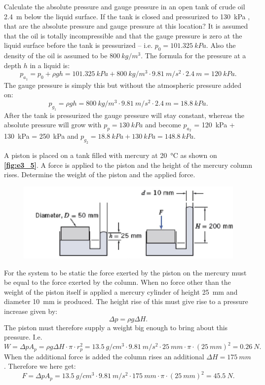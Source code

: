 
Calculate the absolute pressure and gauge pressure in an open tank of crude oil \qty{2,4}{m} below the liquid surface. If the tank is closed and pressurized to \qty{130}{kPa} , that are the absolute pressure and gauge pressure at this location?
\bigbreak
It is assumed that the oil is totally incompressible and that the gauge pressure is zero at the liquid surface before the tank is pressurized -- i.e. $p_0 = \qty{101,325}{kPa}$. Also the density of the oil is assumed to be $\qty{800}{kg/m^3}$. The formula for the pressure at a depth $h$ in a liquid is:
\[ 
p_{a_1} = p_0 + \rho g h = \qty{101,325}{kPa} + \qty{800}{kg/m^3} \cdot \qty{9,81}{m/s^2} \cdot \qty{2.4}{m} = \qty{120}{kPa}
.\]
The gauge pressure is simply this but without the atmospheric pressure added on:
\[ 
p_{g_1} = \rho g h = \qty{800}{kg/m^3} \cdot \qty{9,81}{m/s^2} \cdot \qty{2.4}{m} = \qty{18,8}{kPa}
.\]
After the tank is pressurized the gauge pressure will stay constant, whereas the absolute pressure will grow with $p_p = \qty{130}{kPa}$ and become $p_{a_2}$ = \qty{120}{kPa} + \qty{130}{kPa} = \qty{250}{kPa} and $p_{g_2} = \qty{18,8}{kPa} + \qty{130}{kPa} = \qty{148,8}{kPa}$.


A piston is placed on a tank filled with mercury at \qty{20}{\celsius} as shown on \textbf{\autoref{fig:e3_5}}. A force is applied to the piston and the height of the mercury column rises. Determine the weight of the piston and the applied force.

\begin{figure} [ht]
  \centering
  \includegraphics[width=0.5\linewidth]{./figures/e3_5.png}
  \caption{}
  \label{fig:e3_5}
\end{figure}
\bigbreak
For the system to be static the force exerted by the piston on the mercury must be equal to the force exerted by the column. When no force other than the weight of the piston itself is applied a mercury cylinder of height \qty{25}{mm} and diameter \qty{10}{mm} is produced. The height rise of this must give rise to a pressure increase given by:
\[ 
\Delta p = \rho g \Delta H
.\]
The piston must therefore supply a weight big enough to bring about this pressure. I.e.
\[ 
W = \Delta p A_p = \rho g \Delta H \cdot \pi \cdot r_p^2 = \qty{13,5}{g/cm^3} \cdot \qty{9,81}{m/s^2} \cdot \qty{25}{mm} \cdot \pi \cdot \left( \qty{25}{mm}  \right)^2 = \qty{0,26}{N} 
.\]
When the additional force is added the column rises an additional $\Delta H = \qty{175}{mm}$. Therefore we here get:
\[ 
F = \Delta p A_p = \qty{13,5}{g/cm^3} \cdot \qty{9,81}{m/s^2} \cdot \qty{175}{mm} \cdot \pi \cdot \left( \qty{25}{mm}  \right)^2 = \qty{45,5}{N} 
.\]


